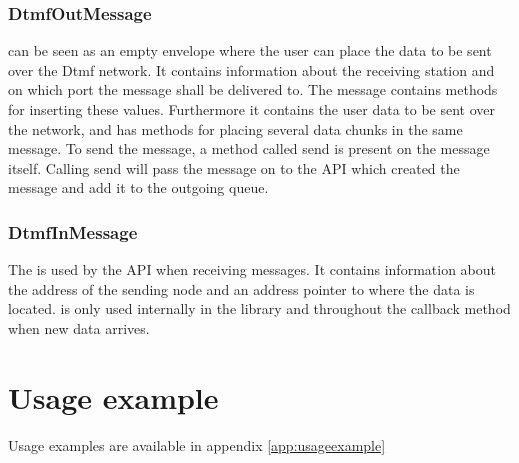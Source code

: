 \subsubsection{DtmfOutMessage}
 can be seen as an empty envelope where the user can place the data to be sent over the Dtmf network. It contains information about the receiving station and on which port the message shall be delivered to. The message contains methods for inserting these values. Furthermore it contains the user data to be sent over the network, and has methods for placing several data chunks in the same message. To send the message, a method called send is present on the message itself. Calling send will pass the message on to the API which created the message and add it to the outgoing queue.

\subsubsection{DtmfInMessage}
The  is used by the API when receiving messages. It contains information about the address of the sending node and an address pointer to where the data is located.  is only used internally in the library and throughout the callback method when new data arrives.

\section{Usage example}
Usage examples are available in appendix \ref{app:usageexample}





